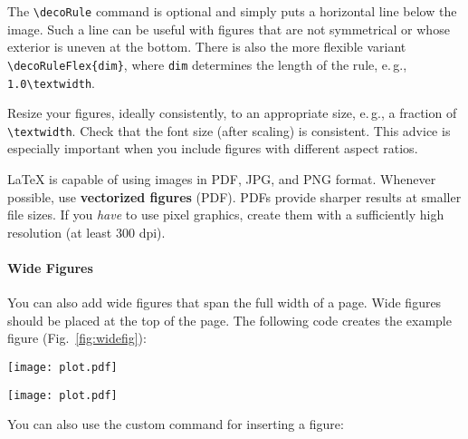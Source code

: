 The \verb|\decoRule| command is optional and simply puts a horizontal line below the image. Such a line can be useful with figures that are not symmetrical or whose exterior is uneven at the bottom. There is also the more flexible variant \verb|\decoRuleFlex{dim}|, where \verb|dim| determines the length of the rule, e.\,g., \verb|1.0\textwidth|.

Resize your figures, ideally consistently, to an appropriate size, e.\,g., a fraction of \texttt{\textbackslash textwidth}. Check that the font size (after scaling) is consistent. This advice is especially important when you include figures with different aspect ratios.

LaTeX is capable of using images in PDF, JPG, and PNG format. Whenever possible, use \textbf{vectorized figures} (PDF). PDFs provide sharper results at smaller file sizes. If you \emph{have} to use pixel graphics, create them with a sufficiently high resolution (at least 300 dpi).


\paragraph{Wide Figures} You can also add wide figures that span the full width of a page. Wide figures should be placed at the top of the page. The following code creates the example figure (Fig.~\ref{fig:widefig}):
\begin{latex}
\begin{figure*}[t] %
\texttt{[image: plot.pdf]}
\caption{\label{fig:widefig}
  This is a full-width figure. Lorem ipsum dolor sit amet, …
}
\end{figure*}
\end{latex}

\begin{figure*}[t]
\texttt{[image: plot.pdf]}
\caption{\label{fig:widefig}This ridge plot is an example of a full-width figure (Source: \texttt{plot.py} in the \emph{examples} folder, obtained from \url{https://seaborn.pydata.org/examples/kde_ridgeplot.html}). Lorem ipsum dolor sit amet, consectetur adipisicing elit, sed do eiusmod tempor incididunt ut labore et dolore magna aliqua.}
\end{figure*}

You can also use the custom command  for inserting a figure:

\begin{latex}
\end{latex}

